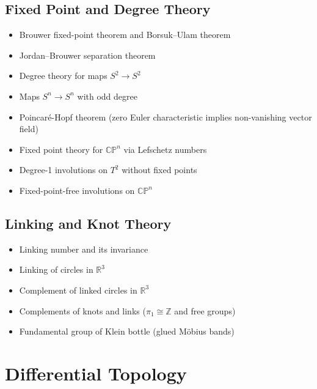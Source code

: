 \documentclass{amsart}
\begin{document}
\subsection{Fixed Point and Degree Theory}
\begin{itemize}
    \item Brouwer fixed-point theorem and Borsuk--Ulam theorem
    \item Jordan--Brouwer separation theorem
    \item Degree theory for maps $S^2 \to S^2$
    \item Maps $S^n \to S^n$ with odd degree
    \item Poincaré-Hopf theorem (zero Euler characteristic implies non-vanishing vector field)
    \item Fixed point theory for $\mathbb{CP}^n$ via Lefschetz numbers
    \item Degree-1 involutions on $T^2$ without fixed points
    \item Fixed-point-free involutions on $\mathbb{CP}^n$
\end{itemize}

\subsection{Linking and Knot Theory}
\begin{itemize}
    \item Linking number and its invariance
    \item Linking of circles in $\mathbb{R}^3$
    \item Complement of linked circles in $\mathbb{R}^3$
    \item Complements of knots and links ($\pi_1 \cong \mathbb{Z}$ and free groups)
    \item Fundamental group of Klein bottle (glued M\"obius bands)
\end{itemize}

\section{Differential Topology}
\end{document}
